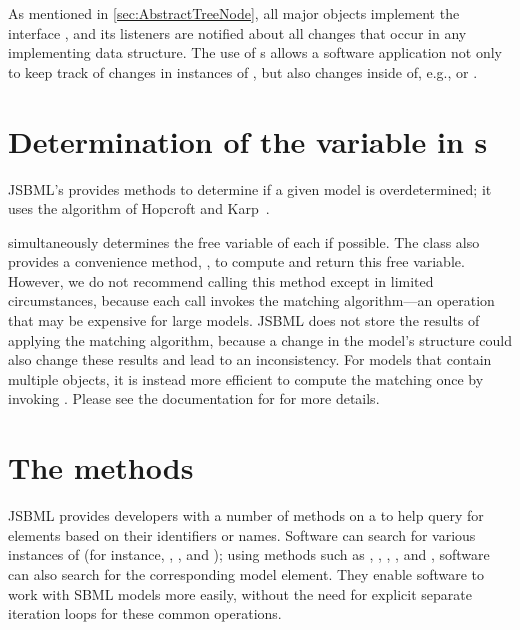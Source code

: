 As mentioned in \vref{sec:AbstractTreeNode}, all major objects implement
the interface \TreeNode, and its listeners are notified about all changes
that occur in any implementing data structure. The use of
\TreeNodeChangeListener{}s allows a software application not only to keep
track of changes in instances of \SBase, but also changes inside of, e.g.,
\CVTerm or \History.


\section{Determination of the variable in s}

JSBML's \OverdeterminationValidator provides methods to determine if a given
model is overdetermined; it uses the
algorithm of Hopcroft and Karp~\cite{Hopcroft1973}.

\OverdeterminationValidator simultaneously determines the free variable of
each \AlgebraicRule if possible. The class \AlgebraicRule also provides a
convenience method, , to compute and return this
free variable.  However, we do not recommend calling this method except in
limited circumstances, because each call invokes the matching algorithm---an
operation that may be expensive for large models. JSBML does not store the
results of applying the matching algorithm, because a change in the model's
structure could also change these results and lead to an inconsistency.  For
models that contain multiple \AlgebraicRule objects, it is instead more
efficient to compute the matching once by invoking
\OverdeterminationValidator. Please see the documentation for \AlgebraicRule
for more details.


\section{The  methods}
\label{sec:find-methods}

JSBML provides developers with a number of  methods
%
on a \Model to help query for elements based on their identifiers or
names. Software can search for various instances of  (for
instance, \CallableSBase, \NamedSBase, and \NamedSBaseWithDerivedUnit);
using methods such as , ,
, , and ,
software can also search for the corresponding model element.  They enable
software to work with SBML models more easily, without the need for
explicit separate iteration loops for these common operations.

